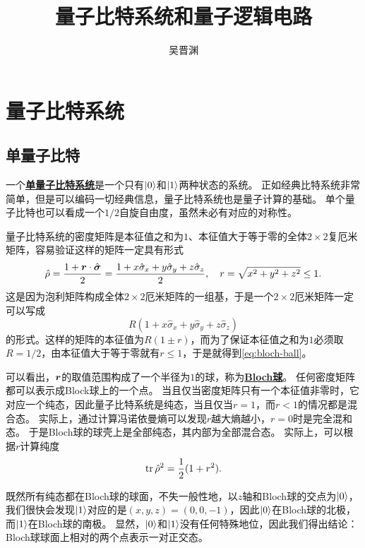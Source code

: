 \documentclass[hyperref, UTF8, a4paper]{ctexart}
\title{量子比特系统和量子逻辑电路}
\author{吴晋渊}
\newcommand*{\concept}[1]{\underline{\textbf{#1}}}
\begin{document}
\maketitle

\section{量子比特系统}

\subsection{单量子比特}\label{sec:single-qubit}

一个\concept{单量子比特系统}是一个只有$\ket{0}$和$\ket{1}$两种状态的系统。
正如经典比特系统非常简单，但是可以编码一切经典信息，量子比特系统也是量子计算的基础。
单个量子比特也可以看成一个$1/2$自旋自由度，虽然未必有对应的对称性。

量子比特系统的密度矩阵是本征值之和为$1$、本征值大于等于零的全体$2 \times 2$复厄米矩阵，容易验证这样的矩阵一定具有形式
\begin{equation}
    \hat{\rho} = \frac{1 + \vb*{r} \cdot \hat{\vb*{\sigma}}}{2} = \frac{1 + x \hat{\sigma}_x + y \hat{\sigma}_y + z \hat{\sigma}_z}{2}, \quad r = \sqrt{x^2+y^2+z^2} \leq 1.
    \label{eq:bloch-ball}
\end{equation}
这是因为泡利矩阵构成全体$2\times 2$厄米矩阵的一组基，于是一个$2\times 2$厄米矩阵一定可以写成
\[
    R(1 + x \hat{\sigma}_x + y \hat{\sigma}_y + z \hat{\sigma}_z)
\]
的形式。这样的矩阵的本征值为$R(1 \pm r)$，而为了保证本征值之和为$1$必须取$R=1/2$，由本征值大于等于零就有$r\leq 1$，于是就得到\eqref{eq:bloch-ball}。

可以看出，$\vb*{r}$的取值范围构成了一个半径为$1$的球，称为\concept{Bloch球}。
任何密度矩阵都可以表示成Block球上的一个点。
当且仅当密度矩阵只有一个本征值非零时，它对应一个纯态，因此量子比特系统是纯态，当且仅当$r=1$，而$r<1$的情况都是混合态。
实际上，通过计算冯诺依曼熵可以发现$r$越大熵越小，$r=0$时是完全混和态。
于是Bloch球的球壳上是全部纯态，其内部为全部混合态。
实际上，可以根据$r$计算纯度
\begin{equation}
    \trace \hat{\rho}^2 = \frac{1}{2} (1 + r^2).
\end{equation}

既然所有纯态都在Bloch球的球面，不失一般性地，以$z$轴和Bloch球的交点为$\ket{0}$，我们很快会发现$\ket{1}$对应的是$(x, y, z) = (0, 0, -1)$，因此$\ket{0}$在Bloch球的北极，而$\ket{1}$在Bloch球的南极。
显然，$\ket{0}$和$\ket{1}$没有任何特殊地位，因此我们得出结论：Bloch球球面上相对的两个点表示一对正交态。
\end{document}
